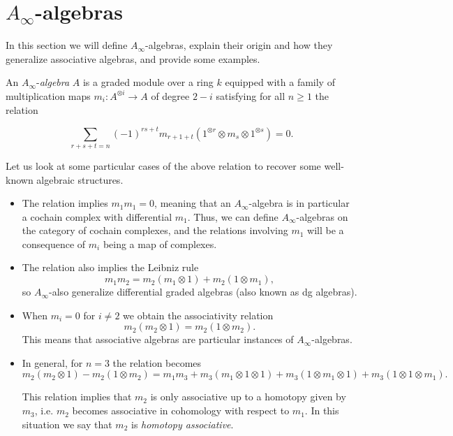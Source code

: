 \documentclass[bibtex,babel-main=english]{TEMat-article}
\begin{document}
\maketitle %

\section{$A_\infty$-algebras}

In this section we will define $A_\infty$-algebras, explain their origin and how they generalize associative algebras, and provide some examples.

\begin{definition}
An $A_\infty$-\emph{algebra} $A$ is a graded module over a ring $k$ equipped with a family of multiplication maps $m_i:A^{\otimes i}\to A$ of degree $2-i$ satisfying for all $n\geq 1$ the relation

\begin{equation}\label{equation}
\sum_{r+s+t=n}(-1)^{rs+t}m_{r+1+t}(1^{\otimes r}\otimes m_s\otimes 1^{\otimes s})=0.
\end{equation} %
\end{definition}

Let us look at some particular cases of the above relation to recover some well-known algebraic structures.
\begin{itemize}
\item The relation implies $m_1m_1=0$, meaning that an $A_\infty$-algebra is in particular a cochain complex with differential $m_1$. Thus, we can define $A_\infty$-algebras on the category of cochain complexes, and the relations involving $m_1$ will be a consequence of $m_i$ being a map of complexes.

\item The relation also implies the Leibniz rule
\[m_1m_2=m_2(m_1\otimes 1)+m_2(1\otimes m_1),\]
so $A_\infty$-also generalize differential graded algebras (also known as dg algebras).
\item When $m_i=0$ for $i\neq 2$ we obtain the associativity relation \[m_2(m_2\otimes 1)=m_2(1\otimes m_2). \]
This means that associative algebras are particular instances of $A_\infty$-algebras.
\item In general, for $n=3$ the relation becomes
\[m_2(m_2\otimes 1)-m_2(1\otimes m_2)=m_1m_3+m_3(m_1\otimes 1\otimes 1)+m_3(1\otimes m_1\otimes 1)+m_3(1\otimes 1\otimes m_1).\]

This relation implies that $m_2$ is only associative up to a homotopy given by $m_3$, i.e. $m_2$ becomes associative in cohomology with respect to $m_1$. In this situation we say that $m_2$ is \emph{homotopy associative}.
\end{itemize}
\end{document}
